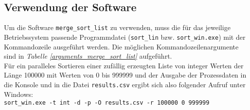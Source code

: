 \subsection{Verwendung der Software}
Um die Software \texttt{merge\_sort\_list} zu verwenden, muss die für das jeweilige Betriebssystem passende Programmdatei (\texttt{sort\_lin} bzw. \texttt{sort\_win.exe}) mit der Kommandozeile ausgeführt werden. Die möglichen Kommandozeilenargumente sind in \textit{Tabelle \ref{arguments_merge_sort_list}} aufgeführt.\\
Für ein paralleles Sortieren einer zufällig erzeugten Liste von integer Werten der Länge 100000 mit Werten von 0 bis 999999 und der Ausgabe der Prozessdaten in die Konsole und in die Datei \texttt{results.csv} ergibt sich also folgender Aufruf unter Windows:\\[0.25 cm]
\texttt{sort\_win.exe -t int -d -p -O results.csv -r 100000 0 999999}

